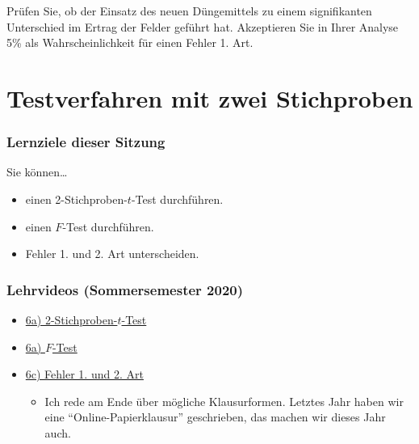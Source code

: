 \documentclass[
  11pt,
  ngerman,
  a4paper,
]{report}
\providecommand{\tightlist}{%
  \setlength{\itemsep}{0pt}\setlength{\parskip}{0pt}}
\begin{document}
Prüfen Sie, ob der Einsatz des neuen Düngemittels zu einem signifikanten Unterschied im Ertrag der Felder geführt hat. Akzeptieren Sie in Ihrer Analyse 5\% als Wahrscheinlichkeit für einen Fehler 1. Art.

\hypertarget{testverfahren-mit-zwei-stichproben}{%
\chapter{Testverfahren mit zwei Stichproben}\label{testverfahren-mit-zwei-stichproben}}

\hypertarget{lernziele-dieser-sitzung-5}{%
\subsection*{Lernziele dieser Sitzung}\label{lernziele-dieser-sitzung-5}}

Sie können\ldots{}

\begin{itemize}
\tightlist
\item
  einen 2-Stichproben-\(t\)-Test durchführen.
\item
  einen \(F\)-Test durchführen.
\item
  Fehler 1. und 2. Art unterscheiden.
\end{itemize}

\hypertarget{lehrvideos-sommersemester-2020-2}{%
\subsection*{Lehrvideos (Sommersemester 2020)}\label{lehrvideos-sommersemester-2020-2}}

\begin{itemize}
\tightlist
\item
  \href{https://video01.uni-frankfurt.de/Mediasite/Play/ef4a65b5bd3748f19f2d3b5cef41be6a1d}{6a) 2-Stichproben-\(t\)-Test}
\item
  \href{https://video01.uni-frankfurt.de/mediasite/mymediasite/presentations/cb5fc2416bcf4c4c8ebd7c645dbbaee21d}{6a) \(F\)-Test}
\item
  \href{https://video01.uni-frankfurt.de/Mediasite/Play/e437fdc1ee5147bb88cbf9b9d03262961d}{6c) Fehler 1. und 2. Art}

  \begin{itemize}
  \tightlist
  \item
    Ich rede am Ende über mögliche Klausurformen. Letztes Jahr haben wir eine \enquote{Online-Papierklausur} geschrieben, das machen wir dieses Jahr auch.
  \end{itemize}
\end{itemize}
\end{document}
